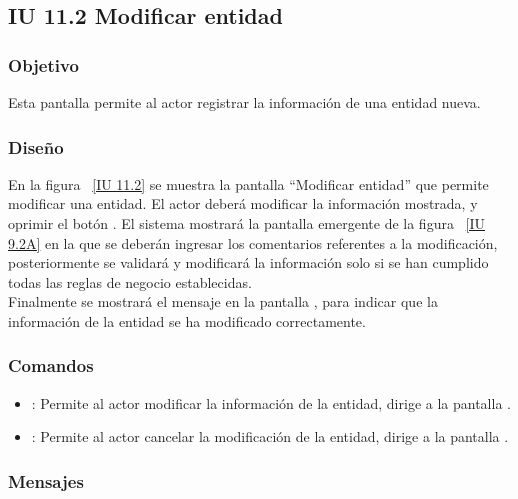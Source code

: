 \subsection{IU 11.2 Modificar entidad}

\subsubsection{Objetivo}
	
	Esta pantalla permite al actor registrar la información de una entidad nueva.

\subsubsection{Diseño}

    En la figura ~\ref{IU 11.2} se muestra la pantalla ``Modificar entidad'' que permite modificar una entidad. El actor deberá modificar la información mostrada,
    y oprimir el botón . El sistema mostrará la pantalla emergente de la figura ~\ref{IU 9.2A} en la que se deberán ingresar los comentarios referentes a la modificación, posteriormente se validará y modificará la información solo si se han cumplido todas las reglas de negocio establecidas. \\
    
    Finalmente se mostrará el mensaje  en la pantalla , para indicar que la información de la entidad se ha modificado correctamente.        

	

\subsubsection{Comandos}
\begin{itemize}
	\item {}: Permite al actor modificar la información de la entidad, dirige a la pantalla .
	\item {}: Permite al actor cancelar la modificación de la entidad, dirige a la pantalla .
\end{itemize}

\subsubsection{Mensajes}

